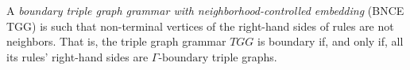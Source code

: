 \begin{definition}
	A \emph{boundary triple graph grammar with neighborhood-controlled embedding} (BNCE TGG) is such that non-terminal vertices of the right-hand sides of rules are not neighbors. That is, the triple graph grammar $TGG$ is boundary if, and only if, all its rules' right-hand sides are $\Gamma\text{-boundary}$ triple graphs.
\end{definition}


